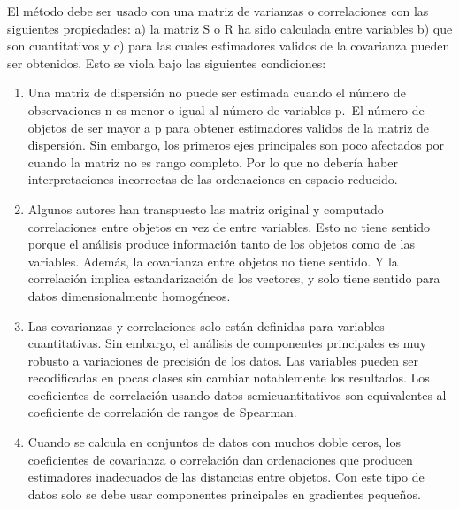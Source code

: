 \documentclass[]{book}
\theoremstyle{definition}
\theoremstyle{definition}
\theoremstyle{definition}
\theoremstyle{remark}
\begin{document}
El método debe ser usado con una matriz de varianzas o correlaciones con
las siguientes propiedades: a) la matriz S o R ha sido calculada entre
variables b) que son cuantitativos y c) para las cuales estimadores
validos de la covarianza pueden ser obtenidos. Esto se viola bajo las
siguientes condiciones:

\begin{enumerate}
\def\labelenumi{\arabic{enumi}.}
\item
  Una matriz de dispersión no puede ser estimada cuando el número de
  observaciones n es menor o igual al número de variables p.~El número
  de objetos de ser mayor a p para obtener estimadores validos de la
  matriz de dispersión. Sin embargo, los primeros ejes principales son
  poco afectados por cuando la matriz no es rango completo. Por lo que
  no debería haber interpretaciones incorrectas de las ordenaciones en
  espacio reducido.
\item
  Algunos autores han transpuesto las matriz original y computado
  correlaciones entre objetos en vez de entre variables. Esto no tiene
  sentido porque el análisis produce información tanto de los objetos
  como de las variables. Además, la covarianza entre objetos no tiene
  sentido. Y la correlación implica estandarización de los vectores, y
  solo tiene sentido para datos dimensionalmente homogéneos.
\item
  Las covarianzas y correlaciones solo están definidas para variables
  cuantitativas. Sin embargo, el análisis de componentes principales es
  muy robusto a variaciones de precisión de los datos. Las variables
  pueden ser recodificadas en pocas clases sin cambiar notablemente los
  resultados. Los coeficientes de correlación usando datos
  semicuantitativos son equivalentes al coeficiente de correlación de
  rangos de Spearman.
\item
  Cuando se calcula en conjuntos de datos con muchos doble ceros, los
  coeficientes de covarianza o correlación dan ordenaciones que producen
  estimadores inadecuados de las distancias entre objetos. Con este tipo
  de datos solo se debe usar componentes principales en gradientes
  pequeños.
\end{enumerate}


\end{document}
